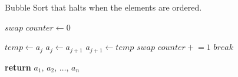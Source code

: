 \documentclass[a4paper, 12pt]{article}
\newcommand{\pluseq}{\mathrel{+}=}
\begin{document}
	
	\begin{algorithm}

		\renewcommand{\thealgorithm}{3.1.37}
		
		\caption{Bubble Sort that halts when the elements are ordered.}
		
		\begin{algorithmic}[1]
			
			
				\State $swap$ $counter \gets 0$
				
						\State $temp \gets a_j$
					 	\State $a_j \gets a_{j+1}$
					 	\State $a_{j+1} \gets temp$
						\State $swap$ $counter \pluseq 1$
					\EndIf
				\EndFor
					\State $break$
				\EndIf
			\EndFor
			
			\State \textbf{return} $a_1$, $a_2$, $\dots$, $a_n$
			\EndProcedure
			
		\end{algorithmic}

	\end{algorithm}
\end{document}
